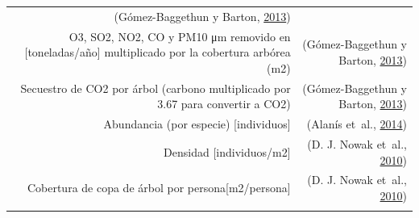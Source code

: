 \documentclass[12pt,a4paper,openany]{book}
\theoremstyle{definition}
\theoremstyle{definition}
\theoremstyle{definition}
\theoremstyle{remark}
\begin{document}
\begin{longtable}[]{@{}rr@{}}
\begin{minipage}[t]{0.31\columnwidth}
(Gómez-Baggethun y Barton,
\protect\hyperlink{ref-gomez-baggethun_classifying_2013}{2013})\strut
\end{minipage}\tabularnewline
\begin{minipage}[t]{0.57\columnwidth}\raggedleft\strut
O3, SO2, NO2, CO y PM10 μm removido en {[}toneladas/año{]} multiplicado
por la cobertura arbórea (m2)\strut
\end{minipage} & \begin{minipage}[t]{0.31\columnwidth}\raggedleft\strut
(Gómez-Baggethun y Barton,
\protect\hyperlink{ref-gomez-baggethun_classifying_2013}{2013})\strut
\end{minipage}\tabularnewline
\begin{minipage}[t]{0.57\columnwidth}\raggedleft\strut
Secuestro de CO2 por árbol (carbono multiplicado por 3.67 para convertir
a CO2)\strut
\end{minipage} & \begin{minipage}[t]{0.31\columnwidth}\raggedleft\strut
(Gómez-Baggethun y Barton,
\protect\hyperlink{ref-gomez-baggethun_classifying_2013}{2013})\strut
\end{minipage}\tabularnewline
\begin{minipage}[t]{0.57\columnwidth}\raggedleft\strut
Abundancia (por especie) {[}individuos{]}\strut
\end{minipage} & \begin{minipage}[t]{0.31\columnwidth}\raggedleft\strut
(Alanís et~al.,
\protect\hyperlink{ref-alanis_estructura_2014}{2014})\strut
\end{minipage}\tabularnewline
\begin{minipage}[t]{0.57\columnwidth}\raggedleft\strut
Densidad {[}individuos/m2{]}\strut
\end{minipage} & \begin{minipage}[t]{0.31\columnwidth}\raggedleft\strut
(D. J. Nowak et~al.,
\protect\hyperlink{ref-nowak_sustaining_2010}{2010})\strut
\end{minipage}\tabularnewline
\begin{minipage}[t]{0.57\columnwidth}\raggedleft\strut
Cobertura de copa de árbol por persona{[}m2/persona{]}\strut
\end{minipage} & \begin{minipage}[t]{0.31\columnwidth}\raggedleft\strut
(D. J. Nowak et~al.,
\protect\hyperlink{ref-nowak_sustaining_2010}{2010})\strut
\end{minipage}\tabularnewline
\begin{minipage}[t]{0.57\columnwidth}\raggedleft\strut

\end{minipage}
\end{longtable}
\end{document}
